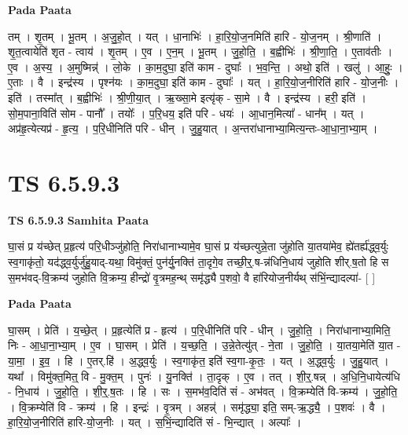\documentclass[17pt]{extarticle}
\begin{document}
\textbf{Pada Paata} \newline

तम् । शृ॒तम् । भू॒तम् । अ॒जु॒हो॒त् । यत् । धा॒नाभिः॑ । हा॒रि॒यो॒ज॒नमिति॑ हारि - यो॒ज॒नम् । श्री॒णाति॑ । शृ॒त॒त्वायेति॑ शृत - त्वाय॑ । शृ॒तम् । ए॒व । ए॒न॒म् । भू॒तम् । जु॒हो॒ति॒ । ब॒ह्वीभिः॑ । श्री॒णा॒ति॒ । ए॒ताव॑तीः । ए॒व । अ॒स्य॒ । अ॒मुष्मिन्न्॑ । लो॒के । का॒म॒दुघा॒ इति॑ काम - दुघाः᳚ । भ॒व॒न्ति॒ । अथो॒ इति॑ । खलु॑ । आ॒हुः॒ । ए॒ताः । वै । इन्द्र॑स्य । पृश्न॑यः । का॒म॒दुघा॒ इति॑ काम - दुघाः᳚ । यत् । हा॒रि॒यो॒ज॒नीरिति॑ हारि - यो॒ज॒नीः । इति॑ । तस्मा᳚त् । ब॒ह्वीभिः॑ । श्री॒णी॒या॒त् । ऋ॒ख्सा॒मे इत्यृ॑क् - सा॒मे । वै । इन्द्र॑स्य । हरी॒ इति॑ । सो॒म॒पाना॒विति॑ सोम - पानौ᳚ । तयोः᳚ । प॒रि॒धय॒ इति॑ परि - धयः॑ । आ॒धान॒मित्या᳚ - धान᳚म् । यत् । अप्र॑हृ॒त्येत्यप्र॑ - हृ॒त्य॒ । प॒रि॒धीनिति॑ परि - धीन् । जु॒हु॒यात् । अ॒न्तरा॑धानाभ्या॒मित्य॒न्तः-आ॒धा॒ना॒भ्या॒म् ।  \newline





\section{ TS 6.5.9.3 }

\textbf{TS 6.5.9.3 } \newline
\textbf{Samhita Paata} \newline

घा॒सं प्र य॑च्छेत् प्र॒हृत्य॑ परि॒धीञ्जु॑होति॒ निरा॑धानाभ्यामे॒व घा॒सं प्र य॑च्छत्युन्ने॒ता जु॑होति या॒तया॑मेव॒ ह्ये॑तर्ह्य॑द्ध्व॒र्युः स्व॒गाकृ॑तो॒ यद॑द्ध्व॒र्युर्जु॑हु॒याद्-यथा॒ विमु॑क्तं॒ पुन॑र्यु॒नक्ति॑ ता॒दृगे॒व तच्छी॒र्॒.ष-न्न॑धिनि॒धाय॑ जुहोति शीर्.ष॒तो हि स स॒मभ॑वद्-वि॒क्रम्य॑ जुहोति वि॒क्रम्य॒ हीन्द्रो॑ वृ॒त्रमह॒न्थ् समृ॑द्ध्यै प॒शवो॒ वै हा॑रियोज॒नीर्यथ् स॑भिं॒न्द्यादल्पा॑- [  ] \newline

\textbf{Pada Paata} \newline

घा॒सम् । प्रेति॑ । य॒च्छे॒त् । प्र॒हृत्येति॑ प्र - हृत्य॑ । प॒रि॒धीनिति॑ परि - धीन् । जु॒हो॒ति॒ । निरा॑धानाभ्या॒मिति॒ निः - आ॒धा॒ना॒भ्या॒म् । ए॒व । घा॒सम् । प्रेति॑ । य॒च्छ॒ति॒ । उ॒न्ने॒तेत्यु॑त् - ने॒ता । जु॒हो॒ति॒ । या॒तया॒मेति॑ या॒त - या॒मा॒ । इ॒व॒ । हि । ए॒तर्.हि॑ । अ॒द्ध्व॒र्युः । स्व॒गाकृ॑त॒ इति॑ स्व॒गा-कृ॒तः॒ । यत् । अ॒द्ध्व॒र्युः । जु॒हु॒यात् । यथा᳚ । विमु॑क्त॒मित्॒ वि - मु॒क्त॒म् । पुनः॑ । यु॒नक्ति॑ । ता॒दृक् । ए॒व । तत् । शी॒र्॒.षन्न् । अ॒धि॒नि॒धायेत्य॑धि - नि॒धाय॑ । जु॒हो॒ति॒ । शी॒र्॒.ष॒तः । हि । सः । स॒मभ॑व॒दिति॑ सं - अभ॑वत् । वि॒क्रम्येति॑ वि-क्रम्य॑ । जु॒हो॒ति॒ । वि॒क्रम्येति॑ वि - क्रम्य॑ । हि । इन्द्रः॑ । वृ॒त्रम् । अहन्न्॑ । समृ॑द्ध्या॒ इति॒ सम्-ऋ॒द्ध्यै॒ । प॒शवः॑ । वै । हा॒रि॒यो॒ज॒नीरिति॑ हारि-यो॒ज॒नीः । यत् । स॒भिं॒न्द्यादिति॑ सं - भि॒न्द्यात् । अल्पाः᳚ ।  \newline
\end{document}
